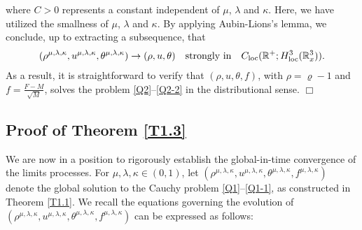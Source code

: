 \documentclass[reqno,11pt]{amsart}
\theoremstyle{plain}
\numberwithin{equation}{section}
\begin{document}
where $C>0$ represents a constant independent of $\mu$, $\lambda$ and $\kappa$. Here, we have utilized the smallness of $\mu$, $\lambda$ and $\kappa$. By applying  Aubin-Lions's lemma, we conclude, up to extracting a subsequence,  that
\begin{align*}  
(\rho^{\mu,\lambda,\kappa}, u^{\mu,\lambda,\kappa}, \theta^{\mu,\lambda,\kappa}) \rightarrow (\rho, u, \theta) \quad \text{strongly in}\quad  C_{\rm loc}(\mathbb{R}^{+}; H^3_{\rm loc}(\mathbb{R}^3_x)).  
\end{align*}  
As a result, it is straightforward to verify that $(\rho, u, \theta, f)$, with $\rho =  \varrho-1$ and $f =\frac{F-M}{\sqrt{M}}  $, solves the problem \eqref{Q2}--\eqref{Q2-2} in the distributional sense. \hfill $\Box$
 

\subsection{Proof of Theorem \ref{T1.3}}
We are now in a position to rigorously establish the
 global-in-time convergence of the limits processes.
  For  $\mu,\lambda,\kappa \in (0,1)$, let $(\rho^{\mu,
  \lambda,\kappa}, u^{\mu,\lambda,\kappa}, \theta^{\mu,\lambda,\kappa},
   f^{\mu,\lambda,\kappa})$ denote the global solution to the Cauchy 
   problem \eqref{Q1}--\eqref{Q1-1}, as constructed in Theorem \ref{T1.1}. 
    We recall the equations governing the evolution of $(\rho^{\mu,\lambda,\kappa},
 u^{\mu,\lambda,\kappa}, \theta^{\mu,\lambda,\kappa}, f^{\mu,\lambda,\kappa})$ can be expressed as follows:
\end{document}
